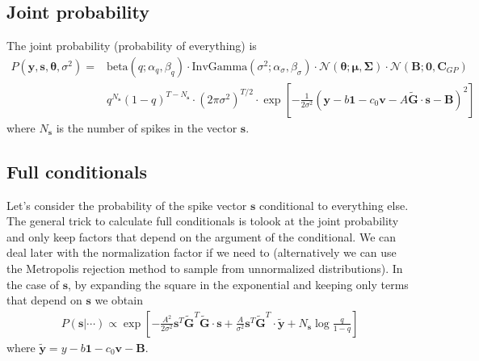 \documentclass{article}
\theoremstyle{remark}
\begin{document}
\subsection{Joint probability}
The joint probability (probability of everything) is
\begin{align}
    P(\bm{y},\bm{s},\bm{\theta},\sigma^2) =& \mathrm{beta}(q; \alpha_q,\beta_q)\cdot \mathrm{InvGamma}(\sigma^2;\alpha_\sigma,\beta_\sigma)\cdot \mathcal{N}(\bm{\theta};\bm{\mu},\bm{\Sigma})\cdot \mathcal{N}(\bm{B};\bm0,\bm{C}_{GP})\nonumber\\
    &q^{N_{\bm{s}}}(1-q)^{T-N_{\bm{s}}}\cdot (2\pi\sigma^2)^{T/2}\cdot \exp\left[-\frac{1}{2\sigma^2}(\bm{y}-b\bm{1} - c_0 \bm{v}-A\bm{\tilde G}\cdot \bm{s}-\bm B)^2\right]\label{eq:joint}
\end{align}
where $N_{\bm{s}}$ is the number of spikes in the vector $\bm{s}$.
\subsection{Full conditionals}
Let's consider the probability of the spike vector $\bm{s}$ conditional to everything else. The general trick to calculate full conditionals is tolook at the joint probability and only keep factors that depend on the argument of the conditional. We can deal later with the normalization factor if we need to (alternatively we can use the Metropolis rejection method to sample from unnormalized distributions). In the case of $\bm{s}$, by expanding the square in the exponential and keeping only terms that depend on $\bm{s}$ we obtain
\begin{align}
    P(\bm{s}|\cdots) \propto \exp\left[-\frac{A^2}{2\sigma^2}\bm{s}^T\bm{\tilde G}^T\bm{\tilde G}\cdot \bm{s}+\frac{A}{\sigma^2}\bm{s}^T\bm{\tilde G}^T\cdot\bm{\tilde y}+N_{\bm{s}}\log\frac{q}{1-q}\right] \label{eq:fc_s}
\end{align}
where $\bm{\tilde y}=y-b\bm{1}-c_0\bm{v}-\bm B$. 
\end{document}
